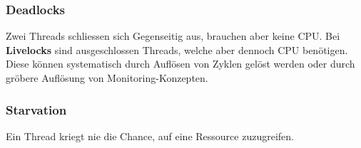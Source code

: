 \subsubsection{Deadlocks}
Zwei Threads schliessen sich Gegenseitig aus, brauchen aber keine CPU. Bei \textbf{Livelocks} sind ausgeschlossen Threads, welche aber dennoch CPU benötigen. Diese können systematisch durch Auflösen von Zyklen gelöst werden oder durch gröbere Auflösung von Monitoring-Konzepten.

\subsubsection{Starvation}
Ein Thread kriegt nie die Chance, auf eine Ressource zuzugreifen. 